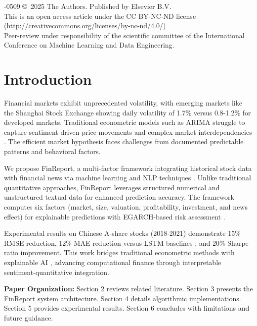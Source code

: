 \documentclass[3p,times,procedia]{elsarticle}
\begin{document}
\vspace{2pt}
-0509 \copyright\ 2025 The Authors. Published by Elsevier B.V.\\
This is an open access article under the CC BY-NC-ND license (http://creativecommons.org/licenses/by-nc-nd/4.0/)\\
Peer-review under responsibility of the scientific committee of the International Conference on Machine Learning and Data Engineering.

\vspace{3pt}

\section{Introduction}
\label{main}
\vspace{-3pt}
Financial markets exhibit unprecedented volatility, with emerging markets like the Shanghai Stock Exchange showing daily volatility of 1.7\% versus 0.8-1.2\% for developed markets. Traditional econometric models such as ARIMA \cite{Box1970} struggle to capture sentiment-driven price movements and complex market interdependencies \cite{FAMA1993}. The efficient market hypothesis faces challenges from documented predictable patterns and behavioral factors.

We propose FinReport, a multi-factor framework integrating historical stock data with financial news via machine learning and NLP techniques \cite{Bao2017}. Unlike traditional quantitative approaches, FinReport leverages structured numerical and unstructured textual data for enhanced prediction accuracy. The framework computes six factors (market, size, valuation, profitability, investment, and news effect) for explainable predictions with EGARCH-based risk assessment \cite{Nelson1991}.

Experimental results on Chinese A-share stocks (2018-2021) \cite{FinReportDataset2025} demonstrate 15\% RMSE reduction, 12\% MAE reduction versus LSTM baselines \cite{Fischer2018}, and 20\% Sharpe ratio improvement. This work bridges traditional econometric methods with explainable AI \cite{TETLOCK2007,Ribeiro2016}, advancing computational finance through interpretable sentiment-quantitative integration.

\vspace{1pt}
\noindent\textbf{Paper Organization:} Section 2 reviews related literature. Section 3 presents the FinReport system architecture. Section 4 details algorithmic implementations. Section 5 provides experimental results. Section 6 concludes with limitations and future guidance.
\end{document}

